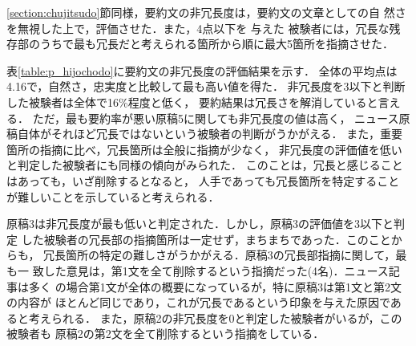 \ref{section:chujitsudo}節同様，要約文の非冗長度は，要約文の文章としての自
然さを無視した上で，評価させた．また，4点以下を
与えた
被験者には，冗長な残
存部のうちで最も冗長だと考えられる箇所から順に最大5箇所を指摘させた．

表\ref{table:p_hijochodo}に要約文の非冗長度の評価結果を示す．
全体の平均点は4.16で，自然さ，忠実度と比較して最も高い値を得た．
非冗長度を3以下と判断した被験者は全体で16\%程度と低く，
要約結果は冗長さを解消していると言える．
ただ，最も要約率が悪い原稿5に関しても非冗長度の値は高く，
ニュース原稿自体がそれほど冗長ではないという被験者の判断がうかがえる．
また，重要箇所の指摘に比べ，冗長箇所は全般に指摘が少なく，
非冗長度の評価値を低いと判定した被験者にも同様の傾向がみられた．
このことは，冗長と感じることはあっても，いざ削除するとなると，
人手であっても冗長箇所を特定することが難しいことを示していると考えられる．

原稿3は非冗長度が最も低いと判定された．しかし，原稿3の評価値を3以下と判定
した被験者の冗長部の指摘箇所は一定せず，まちまちであった．このことからも，
冗長箇所の特定の難しさがうかがえる．原稿3の冗長部指摘に関して，最も一
致した意見は，第1文を全て削除するという指摘だった(4名)．ニュース記事は多く
の場合第1文が全体の概要になっているが，特に原稿3は第1文と第2文の内容が
ほとんど同じであり，これが冗長であるという印象を与えた原因であると考えられる．
また，原稿2の非冗長度を0と判定した被験者がいるが，この被験者も
原稿2の第2文を全て削除するという指摘をしている．

